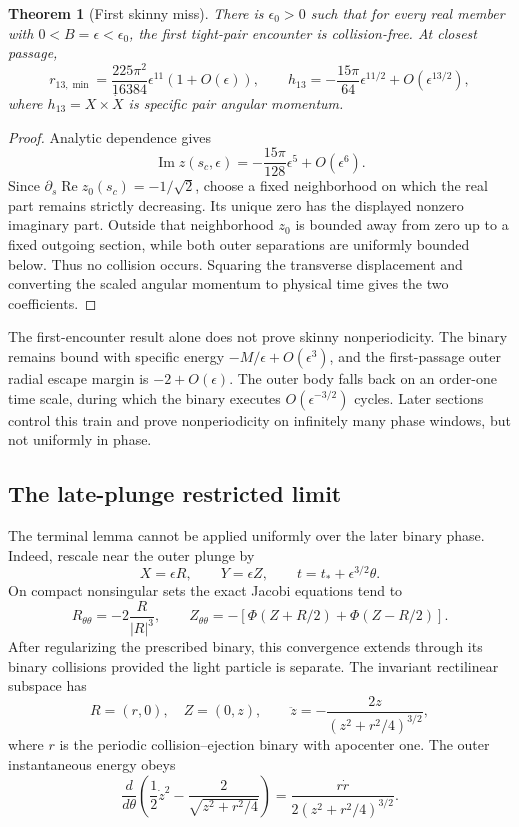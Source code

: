 \documentclass[11pt]{article}
\newtheorem{theorem}{Theorem}
\begin{document}
\begin{theorem}[First skinny miss]
There is $\epsilon_0>0$ such that for every real member with
$0<B=\epsilon<\epsilon_0$, the first tight-pair encounter is collision-free.
At closest passage,
\[
r_{13,\min}=\frac{225\pi^2}{16384}\epsilon^{11}(1+O(\epsilon)),
\qquad
h_{13}=-\frac{15\pi}{64}\epsilon^{11/2}
+O(\epsilon^{13/2}),
\]
where $h_{13}=X\times\dot X$ is specific pair angular momentum.
\end{theorem}
\begin{proof}
Analytic dependence gives
\[
\operatorname{Im}z(s_c,\epsilon)
=-\frac{15\pi}{128}\epsilon^5+O(\epsilon^6).
\]
Since $\partial_s\operatorname{Re}z_0(s_c)=-1/\sqrt2$, choose a fixed
neighborhood on which the real part remains strictly decreasing. Its unique
zero has the displayed nonzero imaginary part. Outside that neighborhood
$z_0$ is bounded away from zero up to a fixed outgoing section, while both
outer separations are uniformly bounded below. Thus no collision occurs.
Squaring the transverse displacement and converting the scaled angular
momentum to physical time gives the two coefficients.
\end{proof}

The first-encounter result alone does not prove skinny nonperiodicity. The binary remains bound
with specific energy $-M/\epsilon+O(\epsilon^3)$, and the first-passage outer
radial escape margin is $-2+O(\epsilon)$. The outer body falls back on an
order-one time scale, during which the binary executes
$O(\epsilon^{-3/2})$ cycles. Later sections control this train and prove
nonperiodicity on infinitely many phase windows, but not uniformly in phase.



\subsection{The late-plunge restricted limit}

The terminal lemma cannot be applied uniformly over the later binary phase.
Indeed, rescale near the outer plunge by
\[
X=\epsilon R,\qquad Y=\epsilon Z,\qquad
t=t_*+\epsilon^{3/2}\theta.
\]
On compact nonsingular sets the exact Jacobi equations tend to
\[
R_{\theta\theta}=-2\frac{R}{|R|^3},\qquad
Z_{\theta\theta}
=-\left[\Phi(Z+R/2)+\Phi(Z-R/2)\right].
\tag{LR}
\]
After regularizing the prescribed binary, this convergence extends through
its binary collisions provided the light particle is separate. The invariant
rectilinear subspace has
\[
R=(r,0),\quad Z=(0,z),\qquad
\ddot z=-\frac{2z}{(z^2+r^2/4)^{3/2}},
\]
where $r$ is the periodic collision--ejection binary with apocenter one.
The outer instantaneous energy obeys
\[
\frac d{d\theta}\left(
\frac12\dot z^2-\frac2{\sqrt{z^2+r^2/4}}\right)
=\frac{r\dot r}{2(z^2+r^2/4)^{3/2}}.
\]
\end{document}
